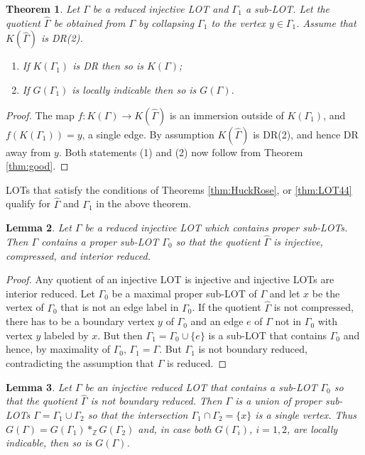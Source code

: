 \documentclass[12pt]{amsart}
\newtheorem{thm}{Theorem}[section]
\newtheorem{lemma}[thm]{Lemma}
\theoremstyle{definition}
\begin{document}
\begin{thm}\label{thm:LOT} Let $\Gamma$ be a reduced injective LOT and $\Gamma_1$ a sub-LOT. Let the quotient $\hat\Gamma$ be obtained from $\Gamma$ by collapsing $\Gamma_1$ to the vertex $y\in \Gamma_1$. Assume that $K(\hat\Gamma)$ is DR(2).
\begin{enumerate}
    \item If $K(\Gamma_1)$ is DR then so is $K(\Gamma)$;
    \item If $G(\Gamma_1)$ is locally indicable then so is $G(\Gamma)$.
\end{enumerate}
\end{thm}

\begin{proof}
The map $f\colon K(\Gamma)\to K(\hat\Gamma)$ is an immersion outside of $K(\Gamma_1)$, and $f(K(\Gamma_1))=y$, a single edge. By assumption $K(\hat\Gamma)$ is DR(2), and hence DR away from $y$. Both statements (1) and (2) now follow from 
Theorem \ref{thm:good}.
\end{proof}

LOTs that satisfy the conditions of Theorems \ref{thm:HuckRose}, or \ref{thm:LOT44} qualify for $\hat \Gamma$ and $\Gamma_1$ in the above theorem. 

\begin{lemma}\label{lem:goodquotient}
    Let $\Gamma$ be a reduced injective LOT which contains proper sub-LOTs. Then $\Gamma$ contains a proper sub-LOT $\Gamma_0$
 so that the quotient $\hat \Gamma$ is injective, compressed, and interior reduced.
 \end{lemma}

\begin{proof}
Any quotient of an injective LOT is injective and injective LOTs are interior reduced. Let $\Gamma_0$ be a maximal proper sub-LOT of $\Gamma$ and let $x$ be the vertex of $\Gamma_0$ that is not an edge label in $\Gamma_0$. If the quotient $\hat \Gamma$ is not compressed, there has to be a boundary vertex $y$ of $\Gamma_0$ and an edge $e$ of $\Gamma$ not in $\Gamma_0$ with vertex $y$ labeled by $x$. But then $\Gamma_1=\Gamma_0\cup\{ e \}$ is a sub-LOT that contains $\Gamma_0$ and hence, by maximality of $\Gamma_0$, $\Gamma_1=\Gamma$. But $\Gamma_1$ is not boundary reduced, contradicting the assumption that $\Gamma$ is reduced. 
\end{proof}

\begin{lemma}\label{lem:union}
    Let $\Gamma$ be an injective reduced LOT that contains a sub-LOT $\Gamma_0$ so that the quotient $\hat \Gamma$ is not boundary reduced. Then $\Gamma$ is a union of proper sub-LOTs $\Gamma=\Gamma_1\cup \Gamma_2$ so that the intersection $\Gamma_1\cap \Gamma_2=\{ x \}$ is a single vertex. Thus $G(\Gamma)=G(\Gamma_1)*_{\mathbb Z} G(\Gamma_2)$ and, in case both $G(\Gamma_i)$, $i=1,2$, are locally indicable, then so is $G(\Gamma)$.
\end{lemma}
\end{document}
